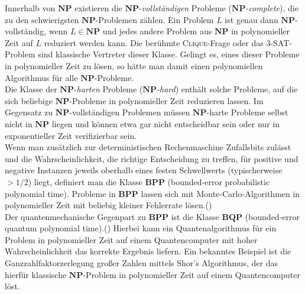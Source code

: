 Innerhalb von \(\mathbf{NP}\) existieren die \(\mathbf{NP}\)-\emph{vollständigen} Probleme (\(\mathbf{NP}\)\emph{-complete}), die zu den schwierigsten \(\mathbf{NP}\)-Problemen zählen. Ein Problem \(L\) ist genau dann \(\mathbf{NP}\)-vollständig, wenn \(L\in\mathbf{NP}\) und jedes andere Problem aus \(\mathbf{NP}\) in polynomieller Zeit auf \(L\) reduziert werden kann. Die berühmte \textsc{Clique}-Frage oder das \textsc{3-SAT}-Problem sind klassische Vertreter dieser Klasse. Gelingt es, eines dieser Probleme in polynomieller Zeit zu lösen, so hätte man damit einen polynomiellen Algorithmus für alle \(\mathbf{NP}\)-Probleme.\\

Die Klasse der \(\mathbf{NP}\)-\emph{harten} Probleme (\(\mathbf{NP}\)\emph{-hard}) enthält solche Probleme, auf die sich beliebige \(\mathbf{NP}\)-Probleme in polynomieller Zeit reduzieren lassen. Im Gegensatz zu \(\mathbf{NP}\)-vollständigen Problemen müssen \(\mathbf{NP}\)-harte Probleme selbst nicht in \(\mathbf{NP}\) liegen und können etwa gar nicht entscheidbar sein oder nur in exponentieller Zeit verifizierbar sein.\\

Wenn man zusätzlich zur deterministischen Rechenmaschine Zufallsbits zulässt und die Wahrscheinlichkeit, die richtige Entscheidung zu treffen, für positive und negative Instanzen jeweils oberhalb eines festen Schwellwerts (typischerweise \(>1/2\)) liegt, definiert man die Klasse \(\mathbf{BPP}\) (bounded‑error probabilistic polynomial time). Probleme in \(\mathbf{BPP}\) lassen sich mit Monte‑Carlo‑Algorithmen in polynomieller Zeit mit beliebig kleiner Fehlerrate lösen.(\cite{zotero-1212}) \\

Der quantenmechanische Gegenpart zu \(\mathbf{BPP}\) ist die Klasse \(\mathbf{BQP}\) (bounded‑error quantum polynomial time).(\cite{zotero-1212}) Hierbei kann ein Quantenalgorithmus für ein Problem in polynomieller Zeit auf einem Quantencomputer mit hoher Wahrscheinlichkeit das korrekte Ergebnis liefern. Ein bekanntes Beispiel ist die Ganzzahlfaktorzerlegung großer Zahlen mittels Shor’s Algorithmus, der das hierfür klassische \(\mathbf{NP}\)-Problem in polynomieller Zeit auf einem Quantencomputer löst.

